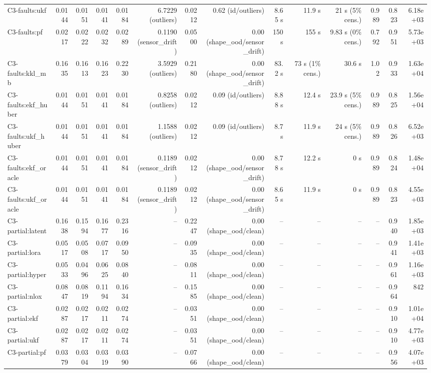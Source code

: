 \begin{table}[t]
\begin{tabular}{lrrrrrrrrrrrrr}
C3-faults:ukf & 0.0144 & 0.0151 & 0.0141 & 0.0184 & 6.7229 (outliers) & 0.0212 & 0.62 (id/outliers) & 8.65 s & 11.9 s & 21 s (5\% cens.) & 0.989 & 0.823 & 6.18e+03 \\
C3-faults:pf & 0.0217 & 0.0222 & 0.0232 & 0.0289 & 0.1190 (sensor\_drift) & 0.0500 & 0.00 (shape\_ood/sensor\_drift) & 150 s & 155 s & 9.83 s (0\% cens.) & 0.792 & 0.951 & 5.73e+03 \\
C3-faults:kkl\_mb & 0.1635 & 0.1613 & 0.1623 & 0.2230 & 3.5929 (outliers) & 0.2180 & 0.00 (shape\_ood/sensor\_drift) & 83.2 s & 73 s (1\% cens.) & 30.6 s & 1.02 & 0.933 & 1.63e+04 \\
C3-faults:ekf\_huber & 0.0144 & 0.0151 & 0.0141 & 0.0184 & 0.8258 (outliers) & 0.0212 & 0.09 (id/outliers) & 8.88 s & 12.4 s & 23.9 s (5\% cens.) & 0.989 & 0.825 & 1.56e+04 \\
C3-faults:ukf\_huber & 0.0144 & 0.0151 & 0.0141 & 0.0184 & 1.1588 (outliers) & 0.0212 & 0.09 (id/outliers) & 8.7 s & 11.9 s & 24 s (5\% cens.) & 0.989 & 0.826 & 6.52e+03 \\
C3-faults:ekf\_oracle & 0.0144 & 0.0151 & 0.0141 & 0.0184 & 0.1189 (sensor\_drift) & 0.0212 & 0.00 (shape\_ood/sensor\_drift) & 8.78 s & 12.2 s & 0 s & 0.989 & 0.824 & 1.48e+04 \\
C3-faults:ukf\_oracle & 0.0144 & 0.0151 & 0.0141 & 0.0184 & 0.1189 (sensor\_drift) & 0.0212 & 0.00 (shape\_ood/sensor\_drift) & 8.65 s & 11.9 s & 0 s & 0.989 & 0.823 & 4.55e+03 \\
C3-partial:latent & 0.1638 & 0.1594 & 0.1677 & 0.2316 & – & 0.2247 & 0.00 (shape\_ood/clean) & – & – & – & – & 0.940 & 1.85e+03 \\
C3-partial:lora & 0.0517 & 0.0508 & 0.0717 & 0.0950 & – & 0.0935 & 0.00 (shape\_ood/clean) & – & – & – & – & 0.941 & 1.41e+03 \\
C3-partial:hyper & 0.0533 & 0.0496 & 0.0625 & 0.0840 & – & 0.0811 & 0.00 (shape\_ood/clean) & – & – & – & – & 0.961 & 1.16e+03 \\
C3-partial:nlox & 0.0847 & 0.0819 & 0.1194 & 0.1634 & – & 0.1585 & 0.00 (shape\_ood/clean) & – & – & – & – & 0.964 & 842 \\
C3-partial:ekf & 0.0287 & 0.0217 & 0.0211 & 0.0274 & – & 0.0351 & 0.00 (shape\_ood/clean) & – & – & – & – & 0.910 & 1.01e+04 \\
C3-partial:ukf & 0.0287 & 0.0217 & 0.0211 & 0.0274 & – & 0.0351 & 0.00 (shape\_ood/clean) & – & – & – & – & 0.910 & 4.77e+03 \\
C3-partial:pf & 0.0379 & 0.0304 & 0.0319 & 0.0390 & – & 0.0766 & 0.00 (shape\_ood/clean) & – & – & – & – & 0.956 & 4.07e+03 \\

\end{tabular}
\end{table}
